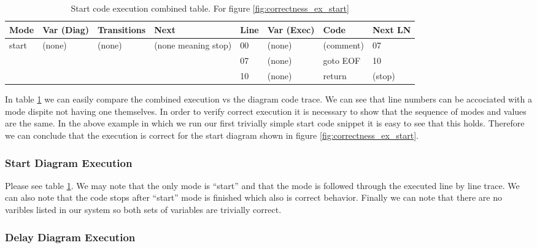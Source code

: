 \begin{table}[htcb]
	\caption{Start code execution combined table. For figure \ref{fig:correctness_ex_start}}
	\centering
	\tablefontsize
		\begin{tabular}{| p{} | p{} | p{} | p{} | p{} | p{} | p{} | p{} |}
			\hline
			\textbf{Mode} 		&	\textbf{Var (Diag)} 		& 	\textbf{Transitions} 		& 	\textbf{Next}		&	\textbf{Line}		&	\textbf{Var (Exec)	}	&	\textbf{Code}	&	\textbf{Next LN} \\
			\hline
			start 				&	(none)						&	(none)						&	(none meaning stop)	&	00					&	(none)					& 	(comment)		&	07 \\
			\hline
								&								&								&						&	07					& 	(none)					& 	goto EOF		& 	10 \\
			\hline
								&								&								&						&	10					&	(none)					&	return			&	(stop) \\
			\hline
		\end{tabular}
	\label{table:BasicExecCombined}
\end{table}

In table \ref{table:BasicExecCombined} we can easily compare the combined execution vs the diagram code trace. 
We can see that line numbers can be accociated with a mode dispite not having one themselves. In order to verify 
correct execution it is necessary to show that the sequence of modes and values are the same. In the above example
 in which we run our first trivially simple start code snippet it is easy to see that this holds. Therefore we can
  conclude that the execution is correct for the start diagram shown in figure \ref{fig:correctness_ex_start}.

\subsubsection{Start Diagram Execution}

Please see table \ref{table:BasicExecCombined}. We may note that the only mode is ``start'' and that the mode
is followed through the executed line by line trace. We can also note that the code stops after ``start'' 
mode is finished which also is correct behavior. Finally we can note that there are no varibles listed in
our system so both sets of variables are trivially correct.

\subsubsection{Delay Diagram Execution}

